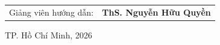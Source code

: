\begin{titlepage}
    \vspace*{55pt}
    \begin{center}
        \begin{tabular}{cl}
            Giảng viên hướng dẫn: & \textbf{ThS. Nguyễn Hữu Quyền}
        \end{tabular}
    \end{center}

    \vspace*{55pt}
    \begin{center}
        {\footnotesize TP. Hồ Chí Minh, 2026}
    \end{center}
\end{titlepage}
